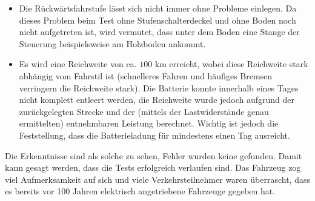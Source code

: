 \begin{itemize}
	\item Die Rückwärtsfahrstufe lässt sich nicht immer ohne Probleme einlegen. Da dieses Problem beim Test ohne Stufenschalterdeckel und ohne Boden noch nicht aufgetreten ist, wird vermutet, dass unter dem Boden eine Stange der Steuerung beispielsweise am Holzboden ankommt.
	\item Es wird eine Reichweite von ca. $100$ km erreicht, wobei diese Reichweite stark abhängig vom Fahrstil ist (schnelleres Fahren und häufiges Bremsen verringern die Reichweite stark). Die Batterie konnte innerhalb eines Tages nicht komplett entleert werden, die Reichweite wurde jedoch aufgrund der zurückgelegten Strecke und der (mittels der Lastwiderstände genau ermittelten) entnehmbaren Leistung berechnet. Wichtig ist jedoch die Feststellung, dass die Batterieladung für mindestens einen Tag ausreicht.
\end{itemize}

Die Erkenntnisse sind als solche zu sehen, Fehler wurden keine gefunden. Damit kann gesagt werden, dass die Tests erfolgreich verlaufen sind. Das Fahrzeug zog viel Aufmerksamkeit auf sich und viele Verkehrsteilnehmer waren überrascht, dass es bereits vor 100 Jahren elektrisch angetriebene Fahrzeuge gegeben hat.

\newpage
\color{black}